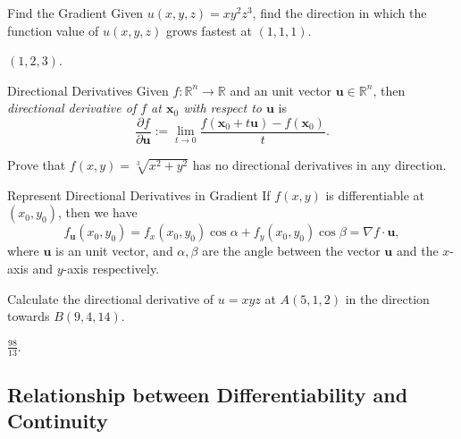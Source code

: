 \begin{example}{Find the Gradient}{}
  Given $u(x,y,z) = xy^2z^3$, find the direction in which the function value of
  $u(x, y, z)$ grows fastest at $(1,1,1)$.
\end{example}

\begin{solution}
  $(1,2,3)$.
\end{solution}

\begin{definition}{Directional Derivatives}{}
  Given $f: \mathbb{R}^n \rightarrow \mathbb{R}$ and an unit vector $\mathbf{u}
  \in \mathbb{R}^n$, then \emph{directional derivative of $f$ at $\mathbf{x}_0$ with respect to $\mathbf{u}$}
  is
  \begin{equation}
    \frac{\partial f}{\partial \mathbf{u}} := \lim \limits _{t \rightarrow 0} \frac{f(\mathbf{x}_0 + t\mathbf{u}) - f(\mathbf{x}_0)}{t}.
  \end{equation}
\end{definition}

\begin{example}{}{}
  Prove that $f(x,y) = \sqrt[3]{x^2 + y^2}$ has no directional derivatives in
  any direction.
\end{example}

\begin{proposition}{Represent Directional Derivatives in Gradient}{}
  If $f(x, y)$ is differentiable at $(x_0, y_0)$,
  then we have
  \begin{equation}
    f_{\mathbf{u}}(x_0, y_0) = f_x(x_0, y_0) \cos \alpha + f_y(x_0, y_0) \cos \beta = \nabla f \cdot \mathbf{u},
  \end{equation}
  where $\mathbf{u}$ is an unit vector, and $\alpha, \beta$ are the angle
  between the vector $\mathbf{u}$ and the $x$-axis and $y$-axis respectively.
\end{proposition}

\begin{example}{}{}
  Calculate the directional derivative of $u = xyz$
  at $A(5,1,2)$ in the direction towards $B(9,4,14)$.
\end{example}

\begin{solution}
  $\frac{98}{13}$.
\end{solution}

\subsection{Relationship between Differentiability and Continuity}

